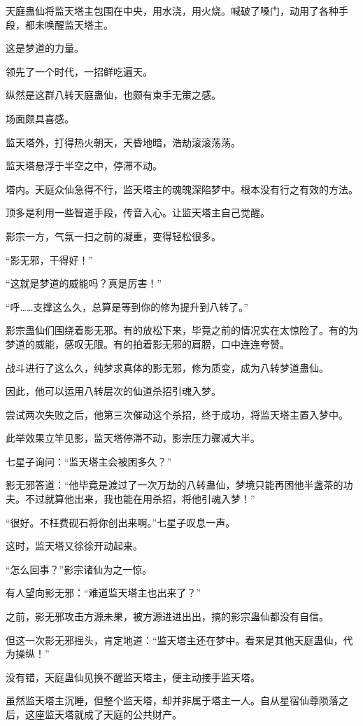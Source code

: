 \begin{this_body}
天庭蛊仙将监天塔主包围在中央，用水浇，用火烧。喊破了嗓门，动用了各种手段，都未唤醒监天塔主。

这是梦道的力量。

领先了一个时代，一招鲜吃遍天。

纵然是这群八转天庭蛊仙，也颇有束手无策之感。

场面颇具喜感。

监天塔外，打得热火朝天，天昏地暗，浩劫滚滚荡荡。

监天塔悬浮于半空之中，停滞不动。

塔内。天庭众仙急得不行，监天塔主的魂魄深陷梦中。根本没有行之有效的方法。

顶多是利用一些智道手段，传音入心。让监天塔主自己觉醒。

影宗一方，气氛一扫之前的凝重，变得轻松很多。

“影无邪，干得好！”

“这就是梦道的威能吗？真是厉害！”

“呼……支撑这么久，总算是等到你的修为提升到八转了。”

影宗蛊仙们围绕着影无邪。有的放松下来，毕竟之前的情况实在太惊险了。有的为梦道的威能，感叹无限。有的拍着影无邪的肩膀，口中连连夸赞。

战斗进行了这么久，纯梦求真体的影无邪，修为质变，成为八转梦道蛊仙。

因此，他可以运用八转层次的仙道杀招引魂入梦。

尝试两次失败之后，他第三次催动这个杀招，终于成功，将监天塔主置入梦中。

此举效果立竿见影，监天塔停滞不动，影宗压力骤减大半。

七星子询问：“监天塔主会被困多久？”

影无邪答道：“他毕竟是渡过了一次万劫的八转蛊仙，梦境只能再困他半盏茶的功夫。不过就算他出来，我也能在用杀招，将他引魂入梦！”

“很好。不枉费砚石将你创出来啊。”七星子叹息一声。

这时，监天塔又徐徐开动起来。

“怎么回事？”影宗诸仙为之一惊。

有人望向影无邪：“难道监天塔主也出来了？”

之前，影无邪攻击方源未果，被方源进进出出，搞的影宗蛊仙都没有自信。

但这一次影无邪摇头，肯定地道：“监天塔主还在梦中。看来是其他天庭蛊仙，代为操纵！”

没有错，天庭蛊仙见换不醒监天塔主，便主动接手监天塔。

虽然监天塔主沉睡，但整个监天塔，却并非属于塔主一人。自从星宿仙尊陨落之后，这座监天塔就成了天庭的公共财产。


\end{this_body}
